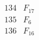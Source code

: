 \documentclass{article}
\begin{document}
{$$\begin{array}{|r|*{7}{r|}}
 & 
 & 
\\
\hline
134 
 & F_{17} &
 & 
 & 
 & 
 & 
 & 
\\
\hline
135 
 & F_{6} &
 & 
 & 
 & 
 & 
 & 
\\
\hline
136 
 & F_{16} &
 & 

\end{array}$$}
\end{document}
